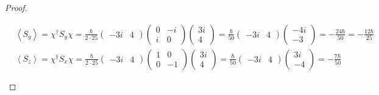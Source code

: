 \documentclass{article}
\begin{document}
\begin{proof}
\begin{itemize}
\begin{align}
            &\left<S_y\right> = \chi^\dagger S_y \chi = \frac{\hbar}{2\cdot 25}\begin{pmatrix}
                -3i&4
            \end{pmatrix}\begin{pmatrix}
                0&-i\\i&0
            \end{pmatrix}\begin{pmatrix}
                3i\\4
            \end{pmatrix} = \frac{\hbar}{50}\begin{pmatrix}
                -3i&4
            \end{pmatrix}\begin{pmatrix}
                -4i\\-3
            \end{pmatrix} = -\frac{24\hbar}{50} = -\frac{12\hbar}{25}\\
            &\left<S_z\right> = \chi^\dagger S_x \chi = \frac{\hbar}{2\cdot 25}\begin{pmatrix}
                -3i&4
            \end{pmatrix}\begin{pmatrix}
                1&0\\0&-1
            \end{pmatrix}\begin{pmatrix}
                3i\\4
            \end{pmatrix} = \frac{\hbar}{50}\begin{pmatrix}
                -3i&4
            \end{pmatrix}\begin{pmatrix}
                3i\\-4
            \end{pmatrix} = -\frac{7\hbar}{50}
        \end{align}

        \hfil


\end{itemize}
\end{proof}
\end{document}
